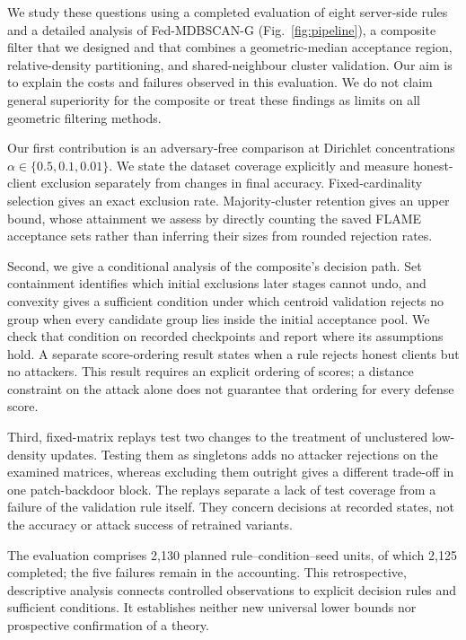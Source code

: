 \documentclass[journal]{IEEEtran}
\newcommand{\method}{Fed-MDBSCAN-G}
\begin{document}
We study these questions using a completed evaluation of eight server-side rules and a detailed analysis of \method{} (Fig.~\ref{fig:pipeline}), a composite filter that we designed and that combines a geometric-median acceptance region, relative-density partitioning, and shared-neighbour cluster validation. Our aim is to explain the costs and failures observed in this evaluation. We do not claim general superiority for the composite or treat these findings as limits on all geometric filtering methods.

Our first contribution is an adversary-free comparison at Dirichlet concentrations $\alpha\in\{0.5,0.1,0.01\}$. We state the dataset coverage explicitly and measure honest-client exclusion separately from changes in final accuracy. Fixed-cardinality selection gives an exact exclusion rate. Majority-cluster retention gives an upper bound, whose attainment we assess by directly counting the saved FLAME acceptance sets rather than inferring their sizes from rounded rejection rates.

Second, we give a conditional analysis of the composite's decision path. Set containment identifies which initial exclusions later stages cannot undo, and convexity gives a sufficient condition under which centroid validation rejects no group when every candidate group lies inside the initial acceptance pool. We check that condition on recorded checkpoints and report where its assumptions hold. A separate score-ordering result states when a rule rejects honest clients but no attackers. This result requires an explicit ordering of scores; a distance constraint on the attack alone does not guarantee that ordering for every defense score.

Third, fixed-matrix replays test two changes to the treatment of unclustered low-density updates. Testing them as singletons adds no attacker rejections on the examined matrices, whereas excluding them outright gives a different trade-off in one patch-backdoor block. The replays separate a lack of test coverage from a failure of the validation rule itself. They concern decisions at recorded states, not the accuracy or attack success of retrained variants.

The evaluation comprises 2{,}130 planned rule--condition--seed units, of which 2{,}125 completed; the five failures remain in the accounting. This retrospective, descriptive analysis connects controlled observations to explicit decision rules and sufficient conditions. It establishes neither new universal lower bounds nor prospective confirmation of a theory.
\end{document}
